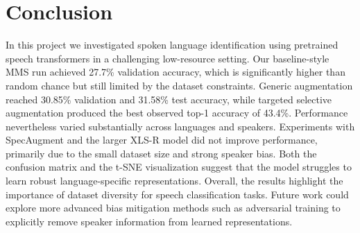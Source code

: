 \documentclass[11pt]{article}
\begin{document}
\section{Conclusion}
In this project we investigated spoken language identification using pretrained speech
transformers in a challenging low-resource setting. Our baseline-style MMS run achieved
27.7\% validation accuracy, which is significantly higher than random chance but still limited
by the dataset constraints. Generic augmentation reached 30.85\% validation and 31.58\% test
accuracy, while targeted selective augmentation produced the best observed top-1 accuracy of
43.4\%. Performance nevertheless varied substantially across languages and speakers.
Experiments with SpecAugment and the larger XLS-R model did not improve performance,
primarily due to the small dataset size and strong speaker bias. Both the confusion matrix
and the t-SNE visualization suggest that the model struggles to learn robust language-specific
representations.
Overall, the results highlight the importance of dataset diversity for speech classification
tasks. Future work could explore more advanced bias mitigation methods such as adversarial
training to explicitly remove speaker information from learned representations.
\end{document}
